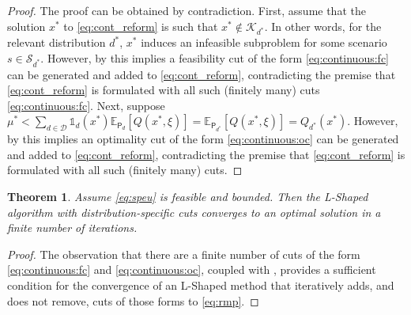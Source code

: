 \documentclass[12pt]{article}
\newtheorem{theorem}{Theorem}%
\theoremstyle{thmstylethree}%
\newcommand{\mtc}[1] {\mathcal{#1}}
\newcommand{\pr}[1]{\ensuremath{\mathsf{#1}}}
\def\Ex{\ensuremath{\mathbb{E}}}
\def\Ind{\ensuremath{\mathbb{1}}}
\begin{document}
\begin{proof}
The proof can be obtained by contradiction. First, assume that the solution $x^*$ to \eqref{eq:cont_reform} is such that $x^*\notin\mtc{K}_{d^*}$. In other words, for the relevant distribution $d^*$, $x^*$ induces an infeasible subproblem for some scenario $s \in \mathcal{S}_{d^*}.$ However, by  this implies a feasibility cut of the form \eqref{eq:continuous:fc} can be generated and added to \eqref{eq:cont_reform}, contradicting the premise that \eqref{eq:cont_reform} is formulated with all such (finitely many) cuts \eqref{eq:continuous:fc}. Next, suppose $\mu^* < \sum_{d\in\mtc{D}}\Ind_d(x^*)\Ex_{\pr{P}_d}[Q(x^*,\xi)] = \Ex_{\pr{P}_{d^*}}[Q(x^*,\xi)]= Q_{d^*}(x^*).$ However, by  this implies an optimality cut of the form \eqref{eq:continuous:oc} can be generated and added to \eqref{eq:cont_reform}, contradicting the premise that \eqref{eq:cont_reform} is formulated with all such (finitely many) cuts.
\end{proof}


\begin{theorem}\label{prop:convergence}
Assume \eqref{eq:speu} is feasible and bounded. Then the L-Shaped algorithm with distribution-specific cuts converges to an optimal solution in a finite number of iterations.  
\end{theorem}
  \begin{proof}
    The observation that there are a finite number of cuts of the form  \eqref{eq:continuous:fc} and \eqref{eq:continuous:oc}, coupled with , provides a sufficient condition for the convergence of an L-Shaped method that iteratively adds, and does not remove, cuts of those forms to \eqref{eq:rmp}.
  \end{proof}
  
\end{document}
